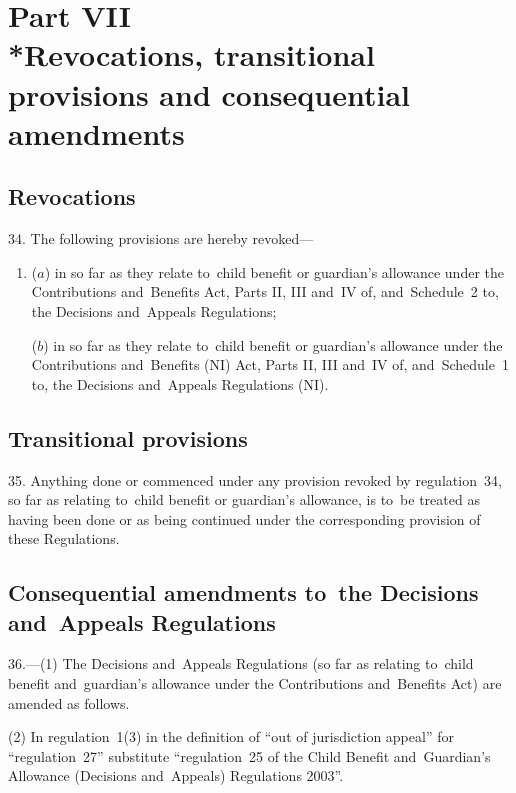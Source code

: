 \documentclass[12pt,a4paper]{article}
\begin{document}
\section[Part VII --- Revocations, transitional provisions and consequential amendments]{Part VII\\*Revocations, transitional provisions and consequential amendments}

\renewcommand\parthead{--- Part VII}

\subsection[34. Revocations]{Revocations}

34.  The following provisions are hereby revoked—
\begin{enumerate}\item[]
($a$) in so far as they relate to~child benefit or guardian’s allowance under the Contributions and~Benefits Act, Parts II, III and~IV of, and~Schedule~2 to, the Decisions and~Appeals Regulations;

($b$) in so far as they relate to~child benefit or guardian’s allowance under the Contributions and~Benefits (NI) Act, Parts II, III and~IV of, and~Schedule~1 to, the Decisions and~Appeals Regulations (NI).
\end{enumerate}

\subsection[35. Transitional provisions]{Transitional provisions}

35.  Anything done or commenced under any provision revoked by regulation~34, so far as relating to~child benefit or guardian’s allowance, is to~be treated as having been done or as being continued under the corresponding provision of these Regulations.

\subsection[36. Consequential amendments to~the Decisions and~Appeals Regulations]{Consequential amendments to~the Decisions and~Appeals Regulations}

36.---(1)  The Decisions and~Appeals Regulations (so far as relating to~child benefit and~guardian’s allowance under the Contributions and~Benefits Act) are amended as follows.

(2) In regulation~1(3) in the definition of “out of jurisdiction appeal” for “regulation~27” substitute “regulation~25 of the Child Benefit and~Guardian’s Allowance (Decisions and~Appeals) Regulations 2003”.
\end{document}
